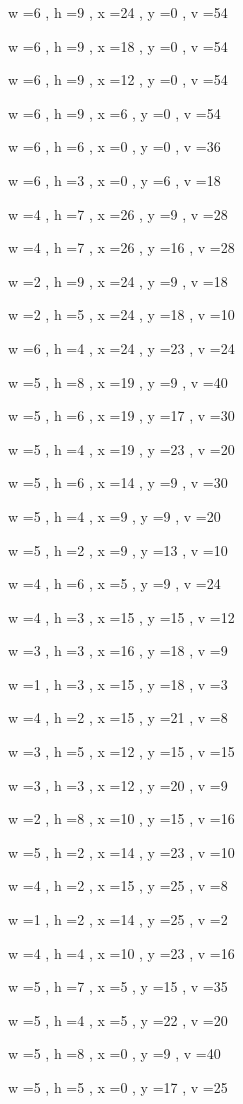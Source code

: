 \documentclass[11pt]{article}
\begin{document}
w =6 , h =9 , x =24 , y =0 , v =54
\par
w =6 , h =9 , x =18 , y =0 , v =54
\par
w =6 , h =9 , x =12 , y =0 , v =54
\par
w =6 , h =9 , x =6 , y =0 , v =54
\par
w =6 , h =6 , x =0 , y =0 , v =36
\par
w =6 , h =3 , x =0 , y =6 , v =18
\par
w =4 , h =7 , x =26 , y =9 , v =28
\par
w =4 , h =7 , x =26 , y =16 , v =28
\par
w =2 , h =9 , x =24 , y =9 , v =18
\par
w =2 , h =5 , x =24 , y =18 , v =10
\par
w =6 , h =4 , x =24 , y =23 , v =24
\par
w =5 , h =8 , x =19 , y =9 , v =40
\par
w =5 , h =6 , x =19 , y =17 , v =30
\par
w =5 , h =4 , x =19 , y =23 , v =20
\par
w =5 , h =6 , x =14 , y =9 , v =30
\par
w =5 , h =4 , x =9 , y =9 , v =20
\par
w =5 , h =2 , x =9 , y =13 , v =10
\par
w =4 , h =6 , x =5 , y =9 , v =24
\par
w =4 , h =3 , x =15 , y =15 , v =12
\par
w =3 , h =3 , x =16 , y =18 , v =9
\par
w =1 , h =3 , x =15 , y =18 , v =3
\par
w =4 , h =2 , x =15 , y =21 , v =8
\par
w =3 , h =5 , x =12 , y =15 , v =15
\par
w =3 , h =3 , x =12 , y =20 , v =9
\par
w =2 , h =8 , x =10 , y =15 , v =16
\par
w =5 , h =2 , x =14 , y =23 , v =10
\par
w =4 , h =2 , x =15 , y =25 , v =8
\par
w =1 , h =2 , x =14 , y =25 , v =2
\par
w =4 , h =4 , x =10 , y =23 , v =16
\par
w =5 , h =7 , x =5 , y =15 , v =35
\par
w =5 , h =4 , x =5 , y =22 , v =20
\par
w =5 , h =8 , x =0 , y =9 , v =40
\par
w =5 , h =5 , x =0 , y =17 , v =25
\par
\end{document}
